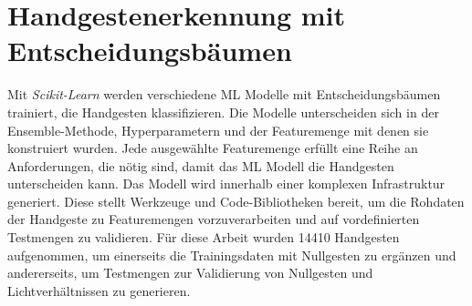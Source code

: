 \chapter{Handgestenerkennung mit Entscheidungsbäumen}
Mit \textit{Scikit-Learn} werden verschiedene ML Modelle mit Entscheidungsbäumen trainiert, die Handgesten klassifizieren. Die Modelle unterscheiden sich in der Ensemble-Methode, Hyperparametern und
der Featuremenge mit denen sie konstruiert wurden. Jede ausgewählte Featuremenge erfüllt eine Reihe an Anforderungen, die nötig sind, damit das ML Modell die Handgesten unterscheiden kann.
\newline
\newline
Das Modell wird innerhalb einer komplexen Infrastruktur generiert. Diese stellt Werkzeuge und Code-Bibliotheken bereit, um die Rohdaten der Handgeste zu Featuremengen vorzuverarbeiten und auf vordefinierten
Testmengen zu validieren. Für diese Arbeit wurden 14410 Handgesten aufgenommen, um einerseits die Trainingsdaten mit Nullgesten zu ergänzen und andererseits, um Testmengen zur Validierung von Nullgesten
und Lichtverhältnissen zu generieren.




